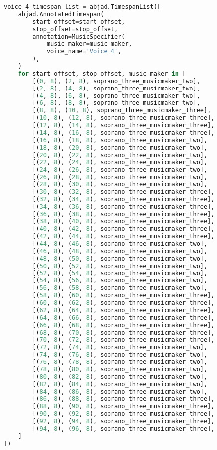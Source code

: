 \begin{lstlisting}[language=Python, caption=Invocation Source Code]
voice_4_timespan_list = abjad.TimespanList([
    abjad.AnnotatedTimespan(
        start_offset=start_offset,
        stop_offset=stop_offset,
        annotation=MusicSpecifier(
            music_maker=music_maker,
            voice_name='Voice 4',
        ),
    )
    for start_offset, stop_offset, music_maker in [
        [(0, 8), (2, 8), soprano_three_musicmaker_two],
        [(2, 8), (4, 8), soprano_three_musicmaker_two],
        [(4, 8), (6, 8), soprano_three_musicmaker_two],
        [(6, 8), (8, 8), soprano_three_musicmaker_two],
        [(8, 8), (10, 8), soprano_three_musicmaker_three],
        [(10, 8), (12, 8), soprano_three_musicmaker_three],
        [(12, 8), (14, 8), soprano_three_musicmaker_three],
        [(14, 8), (16, 8), soprano_three_musicmaker_three],
        [(16, 8), (18, 8), soprano_three_musicmaker_two],
        [(18, 8), (20, 8), soprano_three_musicmaker_two],
        [(20, 8), (22, 8), soprano_three_musicmaker_two],
        [(22, 8), (24, 8), soprano_three_musicmaker_two],
        [(24, 8), (26, 8), soprano_three_musicmaker_two],
        [(26, 8), (28, 8), soprano_three_musicmaker_two],
        [(28, 8), (30, 8), soprano_three_musicmaker_two],
        [(30, 8), (32, 8), soprano_three_musicmaker_three],
        [(32, 8), (34, 8), soprano_three_musicmaker_three],
        [(34, 8), (36, 8), soprano_three_musicmaker_three],
        [(36, 8), (38, 8), soprano_three_musicmaker_three],
        [(38, 8), (40, 8), soprano_three_musicmaker_three],
        [(40, 8), (42, 8), soprano_three_musicmaker_three],
        [(42, 8), (44, 8), soprano_three_musicmaker_three],
        [(44, 8), (46, 8), soprano_three_musicmaker_two],
        [(46, 8), (48, 8), soprano_three_musicmaker_two],
        [(48, 8), (50, 8), soprano_three_musicmaker_two],
        [(50, 8), (52, 8), soprano_three_musicmaker_two],
        [(52, 8), (54, 8), soprano_three_musicmaker_two],
        [(54, 8), (56, 8), soprano_three_musicmaker_two],
        [(56, 8), (58, 8), soprano_three_musicmaker_two],
        [(58, 8), (60, 8), soprano_three_musicmaker_three],
        [(60, 8), (62, 8), soprano_three_musicmaker_three],
        [(62, 8), (64, 8), soprano_three_musicmaker_three],
        [(64, 8), (66, 8), soprano_three_musicmaker_three],
        [(66, 8), (68, 8), soprano_three_musicmaker_three],
        [(68, 8), (70, 8), soprano_three_musicmaker_three],
        [(70, 8), (72, 8), soprano_three_musicmaker_three],
        [(72, 8), (74, 8), soprano_three_musicmaker_two],
        [(74, 8), (76, 8), soprano_three_musicmaker_two],
        [(76, 8), (78, 8), soprano_three_musicmaker_two],
        [(78, 8), (80, 8), soprano_three_musicmaker_two],
        [(80, 8), (82, 8), soprano_three_musicmaker_two],
        [(82, 8), (84, 8), soprano_three_musicmaker_two],
        [(84, 8), (86, 8), soprano_three_musicmaker_two],
        [(86, 8), (88, 8), soprano_three_musicmaker_three],
        [(88, 8), (90, 8), soprano_three_musicmaker_three],
        [(90, 8), (92, 8), soprano_three_musicmaker_three],
        [(92, 8), (94, 8), soprano_three_musicmaker_three],
        [(94, 8), (96, 8), soprano_three_musicmaker_three],
    ]
])


\end{lstlisting}
